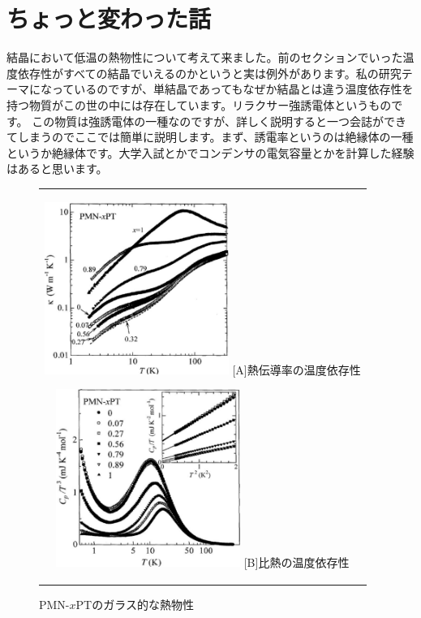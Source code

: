 \documentclass[10pt,b5paper,papersize,dvipdfmx]{jsbook}
\begin{document}
\section{ちょっと変わった話}

結晶において低温の熱物性について考えて来ました。前のセクションでいった温度依存性がすべての結晶でいえるのかというと実は例外があります。私の研究テーマになっているのですが、単結晶であってもなぜか結晶とは違う温度依存性を持つ物質がこの世の中には存在しています。リラクサー強誘電体というものです。
この物質は強誘電体の一種なのですが、詳しく説明すると一つ会誌ができてしまうのでここでは簡単に説明します。まず、誘電率というのは絶縁体の一種というか絶縁体です。大学入試とかでコンデンサの電気容量とかを計算した経験はあると思います。

\begin{figure}[htbp]
  \begin{center}
      \begin{tabular}{c}  
      \begin{minipage}{0.5\hsize}
          \begin{center}
          \includegraphics[clip, width=6cm]{img/relaxor-thermal-conductivity.pdf}
          \hspace{1.6cm} [A]熱伝導率の温度依存性
      \end{center}
  \end{minipage}
  \begin{minipage}{0.5\hsize}
      \begin{center}
          \includegraphics[clip, width=6cm]{img/relaxor-heat-capacity.pdf}
          \hspace{1.6cm} [B]比熱の温度依存性
      \end{center}
      \end{minipage}
      \end{tabular}
      \caption{PMN-$x$PTのガラス的な熱物性\cite{relaxCT}}
      \label{fig:lena}
  \end{center}
\end{figure}
\end{document}

